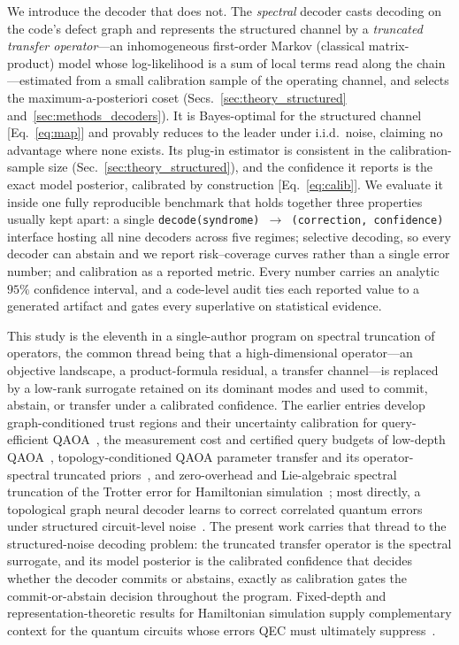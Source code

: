 \documentclass[reprint,aps,prxquantum,amsmath,amssymb,floatfix,nofootinbib,longbibliography]{revtex4-2}
\theoremstyle{definition}
\theoremstyle{remark}
\theoremstyle{plain}
\begin{document}
We introduce the decoder that does not. The \emph{spectral} decoder casts decoding on the code's defect graph and represents the structured channel by a \emph{truncated transfer operator}---an inhomogeneous first-order Markov (classical matrix-product) model whose log-likelihood is a sum of local terms read along the chain---estimated from a small calibration sample of the operating channel, and selects the maximum-a-posteriori coset (Secs.~\ref{sec:theory_structured} and~\ref{sec:methods_decoders}). It is Bayes-optimal for the structured channel [Eq.~\eqref{eq:map}] and provably reduces to the leader under i.i.d.\ noise, claiming no advantage where none exists. Its plug-in estimator is consistent in the calibration-sample size (Sec.~\ref{sec:theory_structured}), and the confidence it reports is the exact model posterior, calibrated by construction [Eq.~\eqref{eq:calib}]. We evaluate it inside one fully reproducible benchmark that holds together three properties usually kept apart: a single \texttt{decode(syndrome)\,$\to$\,(correction, confidence)} interface hosting all nine decoders across five regimes; selective decoding, so every decoder can abstain and we report risk--coverage curves rather than a single error number; and calibration as a reported metric. Every number carries an analytic $95\%$ confidence interval, and a code-level audit ties each reported value to a generated artifact and gates every superlative on statistical evidence.

This study is the eleventh in a single-author program on spectral truncation of operators, the common thread being that a high-dimensional operator---an objective landscape, a product-formula residual, a transfer channel---is replaced by a low-rank surrogate retained on its dominant modes and used to commit, abstain, or transfer under a calibrated confidence. The earlier entries develop graph-conditioned trust regions and their uncertainty calibration for query-efficient QAOA~\cite{huynh2026gctr,huynh2026gctrcalpro}, the measurement cost and certified query budgets of low-depth QAOA~\cite{huynh2026meascost,huynh2026certqb}, topology-conditioned QAOA parameter transfer and its operator-spectral truncated priors~\cite{huynh2026paramxferB,huynh2026ostqaoa,huynh2026topoqaoa}, and zero-overhead and Lie-algebraic spectral truncation of the Trotter error for Hamiltonian simulation~\cite{huynh2026topoham,huynh2026lie}; most directly, a topological graph neural decoder learns to correct correlated quantum errors under structured circuit-level noise~\cite{huynh2026gnndec}. The present work carries that thread to the structured-noise decoding problem: the truncated transfer operator is the spectral surrogate, and its model posterior is the calibrated confidence that decides whether the decoder commits or abstains, exactly as calibration gates the commit-or-abstain decision throughout the program. Fixed-depth and representation-theoretic results for Hamiltonian simulation supply complementary context for the quantum circuits whose errors QEC must ultimately suppress~\cite{nguyen2025zassenhaus,jing2026complexity}.
\end{document}
